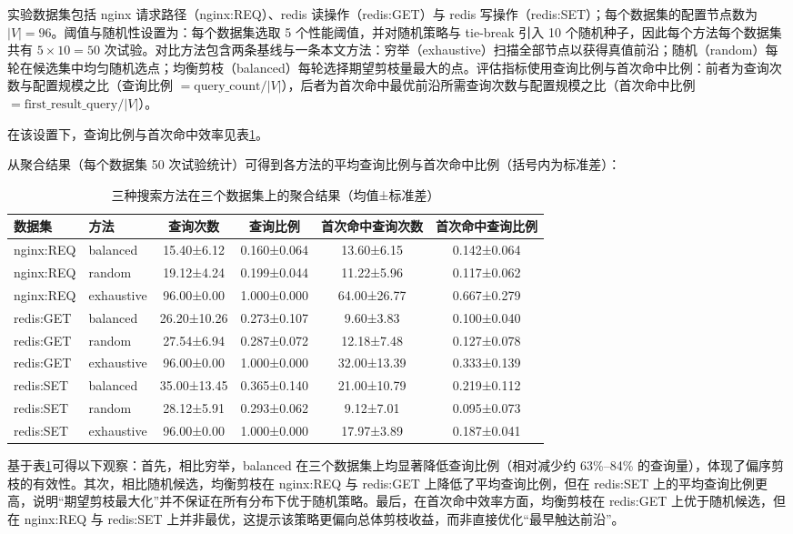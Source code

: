 \documentclass[UTF8,a4paper,12pt]{ctexart}
\numberwithin{equation}{section}
\begin{document}
实验数据集包括 nginx 请求路径（nginx:REQ）、redis 读操作（redis:GET）与
redis 写操作（redis:SET）；每个数据集的配置节点数为
\(|V|=96\)。阈值与随机性设置为：每个数据集选取 5
个性能阈值，并对随机策略与 tie-break 引入 10
个随机种子，因此每个方法每个数据集共有 \(5\times 10=50\)
次试验。对比方法包含两条基线与一条本文方法：穷举（exhaustive）扫描全部节点以获得真值前沿；随机（random）每轮在候选集中均匀随机选点；均衡剪枝（balanced）每轮选择期望剪枝量最大的点。评估指标使用查询比例与首次命中比例：前者为查询次数与配置规模之比（查询比例
\(=\text{query\_count}/|V|\)），后者为首次命中最优前沿所需查询次数与配置规模之比（首次命中比例
\(=\text{first\_result\_query}/|V|\)）。

在该设置下，查询比例与首次命中效率见表\ref{tab:search-agg-results}。

从聚合结果（每个数据集 50
次试验统计）可得到各方法的平均查询比例与首次命中比例（括号内为标准差）：
\begin{table}[htbp]
\centering
\small
\setlength{\tabcolsep}{4pt}
\begin{tabular}{llcccc}
\toprule
数据集 & 方法 & 查询次数 & 查询比例 & 首次命中查询次数 & 首次命中查询比例 \\
\midrule
nginx:REQ & balanced & 15.40±6.12 & 0.160±0.064 & 13.60±6.15 & 0.142±0.064 \\
nginx:REQ & random & 19.12±4.24 & 0.199±0.044 & 11.22±5.96 & 0.117±0.062 \\
nginx:REQ & exhaustive & 96.00±0.00 & 1.000±0.000 & 64.00±26.77 & 0.667±0.279 \\
redis:GET & balanced & 26.20±10.26 & 0.273±0.107 & 9.60±3.83 & 0.100±0.040 \\
redis:GET & random & 27.54±6.94 & 0.287±0.072 & 12.18±7.48 & 0.127±0.078 \\
redis:GET & exhaustive & 96.00±0.00 & 1.000±0.000 & 32.00±13.39 & 0.333±0.139 \\
redis:SET & balanced & 35.00±13.45 & 0.365±0.140 & 21.00±10.79 & 0.219±0.112 \\
redis:SET & random & 28.12±5.91 & 0.293±0.062 & 9.12±7.01 & 0.095±0.073 \\
redis:SET & exhaustive & 96.00±0.00 & 1.000±0.000 & 17.97±3.89 & 0.187±0.041 \\
\bottomrule
\end{tabular}
\caption{三种搜索方法在三个数据集上的聚合结果（均值±标准差）}
\label{tab:search-agg-results}
\end{table}

基于表\ref{tab:search-agg-results}可得以下观察：首先，相比穷举，balanced 在三个数据集上均显著降低查询比例（相对减少约
63\%--84\%
的查询量），体现了偏序剪枝的有效性。其次，相比随机候选，均衡剪枝在
nginx:REQ 与 redis:GET 上降低了平均查询比例，但在 redis:SET
上的平均查询比例更高，说明``期望剪枝最大化''并不保证在所有分布下优于随机策略。最后，在首次命中效率方面，均衡剪枝在
redis:GET 上优于随机候选，但在 nginx:REQ 与 redis:SET
上并非最优，这提示该策略更偏向总体剪枝收益，而非直接优化``最早触达前沿''。
\end{document}
